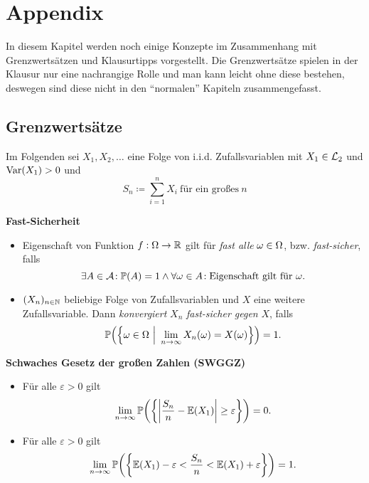 \section{Appendix}

In diesem Kapitel werden noch einige Konzepte im Zusammenhang mit Grenzwertsätzen und Klausurtipps vorgestellt. Die Grenzwertsätze spielen in der Klausur nur eine nachrangige Rolle und man kann leicht ohne diese bestehen, deswegen sind diese nicht in den ``normalen'' Kapiteln zusammengefasst.

\subsection{Grenzwertsätze}

Im Folgenden sei $X_1,X_2,\ldots$ eine Folge von i.i.d. Zufallsvariablen mit $X_1\in\mathcal{L}_2$ und $\operatorname{Var}(X_1)>0$ und
\[
  S_n\coloneqq \sum_{i=1}^n X_i\ \text{für ein großes}\ n
\]

\textbf{Fast-Sicherheit}
\begin{itemize}
	\item Eigenschaft von Funktion $f:\Omega\rightarrow\mathbb{R}$ gilt für \emph{fast alle} $\omega\in\Omega$, bzw. \emph{fast-sicher}, falls
	\[
	  \exists A\in\A\!:\Pr(A)=1\wedge\forall\o\in A\!:\text{Eigenschaft gilt für}\ \o.
	\]
	
	\item $(X_n)_{n\in\mathbb{N}}$ beliebige Folge von Zufallsvariablen und $X$ eine weitere Zufallsvariable. Dann \emph{konvergiert} $X_n$ \emph{fast-sicher gegen} $X$, falls
	\[
	  \Pr\left(\left\{\o\in\O\ \Big\vert\ \limfty{n} X_n(\o)=X(\o)\right\}\right)=1.
	\]
\end{itemize}

\textbf{Schwaches Gesetz der großen Zahlen (SWGGZ)}
\begin{itemize}
	\item Für alle $\varepsilon>0$ gilt
	\[
	  \limfty{n} \Pr\left(\left\{\left\lvert\frac{S_n}{n}-\E(X_1)\right\rvert\geq\varepsilon\right\}\right)=0.
	\]

	\item Für alle $\varepsilon>0$ gilt
	\[
	\limfty{n} \Pr\left(\left\{\E(X_1)-\varepsilon<\frac{S_n}{n}<\E(X_1)+\varepsilon\right\}\right)=1.
	\]
\end{itemize}

